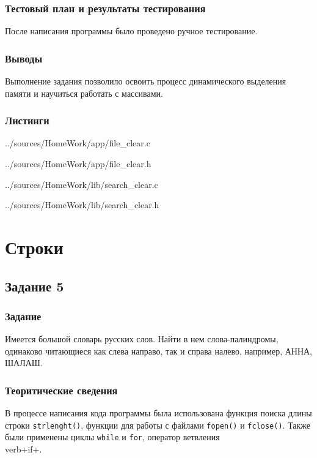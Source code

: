 \documentclass[12pt,a4paper]{report}
\begin{document}
\subsection{Тестовый план и результаты тестирования}
После написания программы было проведено ручное тестирование.

\subsection{Выводы}
Выполнение задания позволило освоить процесс динамического выделения памяти и научиться работать с массивами.

\subsection*{Листинги}


{../sources/HomeWork/app/file_clear.c}


{../sources/HomeWork/app/file_clear.h}


{../sources/HomeWork/lib/search_clear.c}


{../sources/HomeWork/lib/search_clear.h}


\chapter{Строки}
\section{Задание 5}
\subsection{Задание}
Имеется большой словарь русских слов. Найти в нем слова-палиндромы, одинаково читающиеся как слева направо, так и справа налево, например, АННА, ШАЛАШ.

\subsection{Теоритические сведения}
В процессе написания кода программы была использована функция поиска длины строки \verb+strlenght()+, функции для работы с файлами \verb+fopen()+ и \verb+fclose()+. Также были применены циклы \verb+while+ и \verb+for+, оператор ветвления \\verb+if+. 
  
\end{document}
